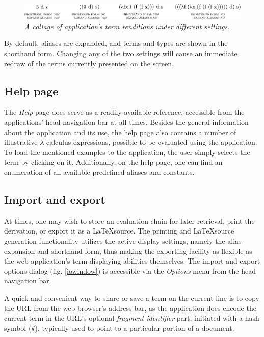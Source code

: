 \documentclass[table, a4paper, 10pt]{book}
\begin{document}
\begin{figure}[H]\centering
\includegraphics[scale=0.74]{displayopts2.pdf}
\vspace{-0.4cm}
\caption{\textit{A collage of application's term renditions under different settings.}}\label{displayopts}
\end{figure}

\noindent
By default, aliases are expanded, and terms and types are shown in the shorthand form.
Changing any of the two settings will cause an immediate redraw of the terms currently
presented on the screen.

\subsection{Help page}
The \textit{Help} page does serve as a readily available reference, accessible from the 
applications' head navigation bar at all times. Besides the general information about the application
and its use, the help page also contains a number of illustrative $\lambda$-calculus expressions, possible to be
evaluated using the application. To load the mentioned examples to the application, the user simply
selects the term by clicking on it. Additionally, on the help page, one can find
an enumeration of all available predefined aliases and constants.

\subsection{Import and export} \label{sec:io}
At times, one may wish to store an evaluation chain for later retrieval, print the derivation,
or export it as a \LaTeX\;source.
The printing and \LaTeX\;source generation functionality utilizes the active display settings,
namely the alias expansion and shorthand form, thus making the exporting
facility as flexible as the web application's term-displaying abilities themselves.
The import and export options dialog (fig. \ref{iowindow}) is accessible
via the \textit{Options} menu from the head navigation bar.

A quick and convenient way to share or save a term on the current line is to copy the
URL from the web browser's address bar, as the application does encode
the current term in the URL's optional \textit{fragment identifier} part,
initiated with a hash symbol (\texttt{\#}), typically used to point to a particular 
portion of a document.
\end{document}
